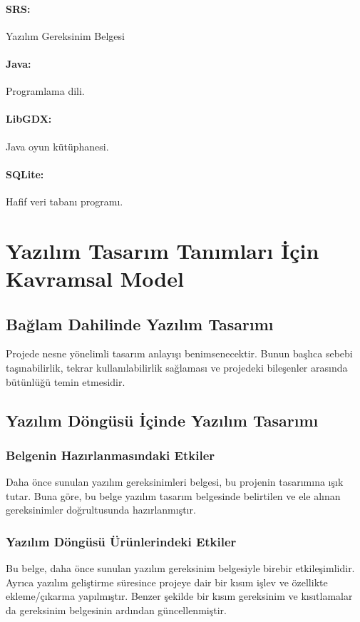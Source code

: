 \documentclass[12pt,a4paper]{article}
\begin{document}
   \paragraph{SRS:} Yazılım Gereksinim Belgesi
   \paragraph{Java:} Programlama dili.
   \paragraph{LibGDX:} Java oyun kütüphanesi.
   \paragraph{SQLite:} Hafif veri tabanı programı.
   
   \section{Yazılım Tasarım Tanımları İçin Kavramsal Model}
   \subsection{Bağlam Dahilinde Yazılım Tasarımı}
   Projede nesne yönelimli tasarım anlayışı benimsenecektir. Bunun başlıca sebebi taşınabilirlik, tekrar kullanılabilirlik sağlaması ve projedeki bileşenler arasında bütünlüğü temin etmesidir.

   \subsection{Yazılım Döngüsü İçinde Yazılım Tasarımı}
   \subsubsection{Belgenin Hazırlanmasındaki Etkiler}
   Daha önce sunulan yazılım gereksinimleri belgesi, bu projenin tasarımına ışık tutar. Buna göre, bu belge yazılım tasarım belgesinde belirtilen ve ele alınan gereksinimler doğrultusunda hazırlanmıştır.

   \subsubsection{Yazılım Döngüsü Ürünlerindeki Etkiler}
   Bu belge, daha önce sunulan yazılım gereksinim belgesiyle birebir etkileşimlidir. Ayrıca yazılım geliştirme süresince projeye dair bir kısım işlev ve özellikte ekleme/çıkarma yapılmıştır. Benzer şekilde bir kısım gereksinim ve kısıtlamalar da gereksinim belgesinin ardından güncellenmiştir.
\end{document}
